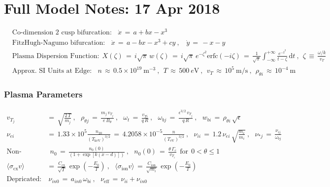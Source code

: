 \documentclass[a4paper,8pt]{article}
\date{}
\begin{document}
\section{Full Model Notes: 17 Apr
2018}\label{full-model-notes-17-apr-2018}

\small

\begin{align}
    &\text{Co-dimension 2 cusp bifurcation:} ~~~~ \dot{x} \,=\, a + bx - x^3 \\
    &\text{FitzHugh-Nagumo bifurcation:} ~~~~ \dot{x} \,=\, a - bx - x^3 + cy~,
        ~~~~ \dot{y} \,=\, -x - y \\
    &\text{Plasma Dispersion Function:} ~~ X(\zeta) \,=\, i \sqrt{\pi}\,w(\zeta)
        \,=\, i \sqrt{\pi} \, e^{-\zeta^2} \text{erfc}(-i \zeta)
        \,=\, \frac{1}{\sqrt{\pi}} \int_{-\infty}^{+\infty}
        \frac{e^{-t^2}}{t - \zeta} \, \text{d}t~,~~
        \zeta \,\equiv\, \frac{\omega/k}{v_T} \\
    &\text{Approx. SI Units at Edge:} ~~~~ n \,\approx\, 0.5\times 10^{19}~\text{m}^{-3}~,
        ~~ T \,\approx\, 500~e\text{V}~,~~ v_T \,\approx\, 10^5~\text{m}/\text{s}~,
        ~~ \rho_{\theta i} \,\approx\, 10^{-4}~\text{m}
\end{align}

\normalsize

\subsubsection{Plasma Parameters}\label{plasma-parameters}

\small

\begin{align}
    v_{T_j} \,&=\, \sqrt{\frac{2 \, T}{m_j}}~,~~~
        \rho_{\theta j} \,=\, \frac{m_j \, v_{T_j}}{e \, B_\theta}~,~~~
        \omega_t \,=\, \frac{v_{Ti}}{q\,R}~,~~~
        \omega_{bj} \,=\, \frac{\epsilon^{3/2} \, v_{T_j}}{q \, R}~,~~~
        w_{bi} \,=\, \rho_{\theta i} \, \sqrt{\epsilon} \\
    \nu_{ei} \,&=\, 1.33\times 10^5 \frac{n_{20}}{(T_\text{keV})^{3/2}}
        \,=\, 4.2058\times 10^{-5} \frac{n}{(T_\text{eV})^{3/2}}~,~~~
        \nu_{ii} \,=\, 1.2\, \nu_{ei} \, \sqrt{\frac{m_e}{m_i}}~,~~~
        \nu_{*j} \,=\, \frac{\nu_{ij}}{\omega_{bj}} \\
    \text{Non-formal:}& ~~ n_0 \,=\, \frac{n_0(0)}
        {\left(1 + \exp\left[k(x - d)\right]\right)}~,~~~
        n_0(0) \,=\, \frac{\theta \, \Gamma_c}{v_{T_i}} ~~ \text{for} ~~
        0 < \theta \leq 1 \\
    \langle \sigma_\text{cx} v \rangle \,&=\, \frac{C_\text{cx}}{\sqrt{T}} \,
        \exp\left(-\frac{E_0}{T}\right)~,~~~
        \langle \sigma_\text{ion} v \rangle \,=\, \frac{C_\text{ion}}{\sqrt{m_i}} \,
        \exp\left(-\frac{E_0}{T}\right) \\
    \text{Depricated:}&~\nu_{in0} \,=\, a_{in0} \, \omega_{bi}~,~~~
        \nu_\text{eff} \,=\, \nu_{ii} + \nu_{in0}
\end{align}
\end{document}
